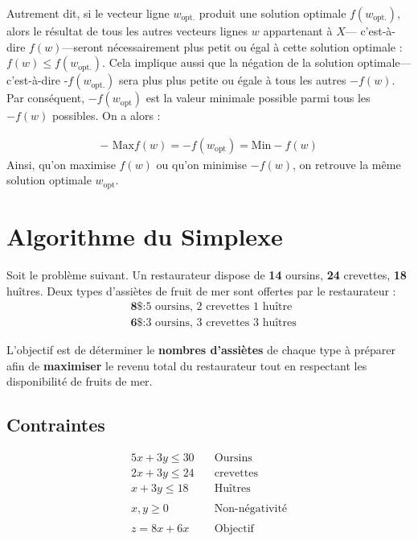 \documentclass{report}
\begin{document}
\begin{multicols*}{2}
    Autrement dit, si le vecteur ligne $w_{\text{opt}.}$ produit une solution optimale $f(w_{\text{opt}.})$, 
    alors le résultat de tous les autres vecteurs lignes $w$ appartenant à $X$--- 
    c'est-à-dire $f(w)$---seront nécessairement 
    plus petit ou égal à cette solution optimale : $f(w) \leq f(w_{\text{opt}.})$. Cela 
    implique aussi que la négation de la solution optimale---c'est-à-dire -$f(w_{\text{opt.}})$ 
    sera plus plus petite ou égale à tous les autres $-f(w)$. 
    Par conséquent, $-f(w_{\text{opt}})$ est la valeur minimale possible parmi 
    tous les $-f(w)$ possibles. On a alors :

    \begin{align*}
        \boxed{
        - \text{ Max} f(w) = 
        - f\left(w_{\text{opt}}\right) = 
        \text{Min} -f(w)
    }
    \end{align*}
    Ainsi, qu'on maximise $f(w)$ ou qu'on minimise $-f(w)$, on retrouve la 
    même solution optimale $w_{\text{opt}}$.
                 

\chapter{Algorithme du Simplexe}
Soit le problème suivant. Un restaurateur dispose de \textbf{14} oursins, 
\textbf{24} crevettes, \textbf{18} huîtres. Deux types d'assiètes 
de fruit de mer sont offertes par le restaurateur :
\begin{align*}
    &\textbf{8\$} \colon \text{5 oursins, 2 crevettes 1 huître}  \\
    &\textbf{6\$} \colon \text{3 oursins, 3 crevettes 3 huîtres}   
\end{align*}

L'objectif est de déterminer le \textbf{nombres d'assiètes} de chaque 
type à préparer afin de \textbf{maximiser} 
le revenu total du restaurateur tout en 
respectant les disponibilité de fruits de mer. 

\section{Contraintes}
\begin{align*}
    5x + 3y \leq 30& \quad \text{Oursins} \\
    2x + 3y \leq 24& \quad \text{crevettes} \\ 
    x  + 3y \leq 18& \quad \text{Huîtres}
    \\
    \\ 
    x, y \geq 0& \quad \text{Non-négativité}
    \\ 
    \\
    z = 8x + 6x& \quad \text{Objectif}
\end{align*}


\end{multicols*}
\end{document}
